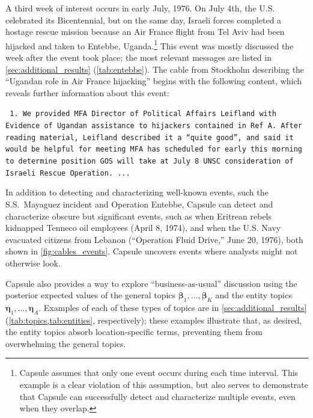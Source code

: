 A third week of interest occurs in early July, 1976.  On July 4th, the
U.S. celebrated its Bicentennial, but on the same day, Israeli forces
completed a hostage rescue mission because an Air France flight from
Tel Aviv had been hijacked and taken to Entebbe,
Uganda.\footnote{Capsule assumes that only one event occurs during
  each time interval. This example is a clear violation of this
  assumption, but also serves to demonstrate that Capsule can
  successfully detect and characterize multiple events, even when they
  overlap.} This event was mostly discussed the week after the event
took place; the most relevant messages are listed in
\cref{sec:additional_results} (\cref{tab:entebbe}). The cable from
Stockholm describing the ``Ugandan role in Air France hijacking''
begins with the following content, which reveals further information
about this event:
\begin{shaded*} \tt{
1. We provided MFA Director of Political Affairs
Leifland with Evidence of Ugandan assistance to
hijackers contained in Ref A.  After reading material,{}
Leifland described it a ``quite good'', and said it{}
would be helpful for meeting MFA has scheduled for
early this morning to determine position GOS will take
at July 8 UNSC consideration of Israeli Rescue Operation. ...
}
\end{shaded*}

In addition to detecting and characterizing well-known events, such
the S.S.~Mayaguez incident and Operation Entebbe, Capsule can detect
and characterize obscure but significant events, such as when Eritrean rebels 
kidnapped Tenneco oil employees (April 8, 1974), and when the U.S. Navy evacuated citizens 
from Lebanon (``Operation Fluid Drive,'' June 20, 1976),
both shown in \cref{fig:cables_events}.
Capsule uncovers events where analysts might not otherwise look.

Capsule also provides a way to explore ``business-as-usual''
discussion using the posterior expected values of the general topics
$\mathbold{\beta}_1, \ldots, \mathbold{\beta}_K$ and the entity topics
$\mathbold{\eta}_1, \ldots, \mathbold{\eta}_A$. Examples of each of
these types of topics are in \cref{sec:additional_results}
(\cref{tab:topics,tab:entities}, respectively); these examples
illustrate that, as desired, the entity topics absorb
location-specific terms, preventing them from overwhelming the general
topics.


